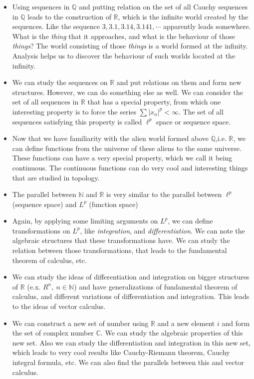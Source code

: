 \documentclass[12pt,a4paper]{article}
\newcommand{\R}{\mathbb{R}}
\newcommand{\N}{\mathbb{N}}
\newcommand{\C}{\mathbb{C}}
\newcommand{\Q}{\mathbb{Q}}
\newcommand{\abs}[1]{|#1|\xspace}
\begin{document}
	\begin{itemize}
		\item Using sequences in $\Q$ and putting relation on the set of all Cauchy sequences in $\Q$ leads to the construction of $\R$, which is the infinite world created by the sequences. Like the sequence $3, 3.1, 3.14, 3.141, \cdots$ apparently leads somewhere. What is the \emph{thing} that it approaches, and what is the behaviour of those \emph{things}? The world consisting of those \emph{things} is a world formed at the infinity. Analysis helps us to discover the behaviour of such worlds located at the infinity.
		\item We can study the sequences on $\R$ and put relations on them and form new structures. However, we can do something else as well. We can consider the set of all sequences in $\R$ that has a special property, from which one interesting property is to force the series $\sum \abs{x_n}^p < \infty$. The set of all sequences satisfying this property is called $\ell^p$ space or sequence space. 
		\item Now that we have familiarity with the alien world formed above $\Q$,i.e. $\R$, we can define functions from the universe of these aliens to the same universe. These functions can have a very special property, which we call it being continuous. The continuous functions can do very cool and interesting things that are studied in topology.
		\item The parallel between $\N$ and $\R$ is very similar to the parallel between $\ell^p$ (sequence space) and $L^p$ (function space)
		\item Again, by applying some limiting arguments on $L^p$, we can define transformations on $L^p$, like \emph{integration}, and \emph{differentiation}. We can note the algebraic structures that these transformations have. We can study the relation between those transformations, that leads to the fundamental theorem of calculus, etc.
		\item We can study the ideas of differentiation and integration on bigger structures of $\R$ (e.x. $R^n,\ n\in\N$) and have generalizations of fundamental theorem of calculus, and different variations of differentiation and integration. This leads to the ideas of vector calculus.
		\item We can construct a new set of number using $\R$ and a new element $i$ and form the set of complex number $\C$. We can study the algebraic properties of this new set. Also we can study the differentiation and integration in this new set, which leads to very cool results like Cauchy-Riemann theorem, Cauchy integral formula, etc. We can also find the parallels between this and vector calculus.
	\end{itemize}
\end{document}
